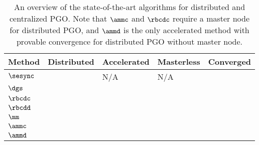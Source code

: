 \begin{table}
	\centering
		\renewcommand{\arraystretch}{1.2}
	\setlength{\tabcolsep}{0.3em}
	\caption{An overview of the state-of-the-art algorithms for distributed and centralized PGO. Note that $\ammc$ and $\rbcdc$ require a master node for distributed PGO, and $\ammd$  is the only accelerated method with provable convergence for distributed PGO without master node.
	}\label{table::cmp_method}
	\begin{tabular}{|P{0.125\textwidth}|P{0.07\textwidth}|P{0.075\textwidth}|P{0.085\textwidth}|P{0.075\textwidth}|}
		\hline			
		{Method} &{Distributed} & {Accelerated}  &Masterless & {Converged}\\
		\hline
		\hline
		$\sesync$\cite{rosen2016se}& \xmark & N/A & N/A & \cmark \\
		\hline
		$\dgs$\cite{choudhary2017distributed} &\cmark & \xmark & \cmark & \xmark \\
		\hline
		$\rbcdc$\cite{tian2019distributed}&\cmark& \cmark & \xmark & \cmark\\
		\hline
		$\rbcdd$\cite{tian2019distributed}&\cmark & \cmark & \cmark & \xmark\\
		\hline
		$\mm$ & \cmark &\xmark & \cmark & \cmark \\
		\hline
		$\ammc$&\cmark & \cmark & \xmark & \cmark\\
		\hline
		$\ammd$&\cmark & \cmark & \cmark & \cmark \\
		\hline
	\end{tabular}
\end{table}